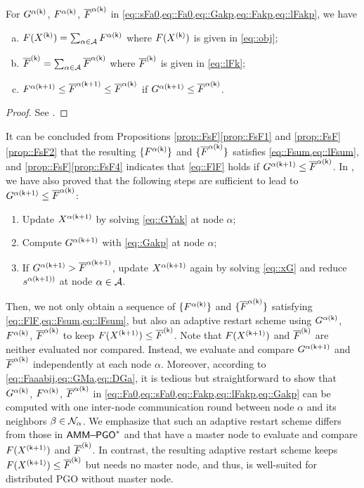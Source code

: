 {
\begin{prop}\label{prop::FsF}
For $G^{\ak}$, $F^{\ak}$, $\sF^{\ak}$ in \cref{eq::sFa0,eq::Fa0,eq::Gakp,eq::Fakp,eq::lFakp}, we have
\begin{enumerate}[(a)]
\item\label{prop::FsF1} $F(\Xk)=\sum_{\alpha\in\AA} F^{\ak}$ where $F(\Xk)$ is given in \cref{eq::obj};\\[-0.8em]
\item\label{prop::FsF2} $\sF^{(\sk)}=\sum_{\alpha\in\AA}\sF^{\ak}$  where $\sF^{(\sk)}$ is given in \cref{eq::lFk};\\[-0.8em]
\item\label{prop::FsF4} $F^{\akp}\leq\sF^{\akp} \leq \sF^{\ak}$ if $\sG^{\akp} \leq \sF^{\ak}$.
\end{enumerate}
\end{prop}
\begin{proof}
	See .
\end{proof}


It can be concluded from Propositions \ref{prop::FsF}\ref{prop::FsF1} and \ref{prop::FsF}\ref{prop::FsF2} that the resulting $\{F^{\ak}\}$ and $\{\lF^{\ak}\}$ satisfies \cref{eq::Fsum,eq::lFsum}, and \cref{prop::FsF}\ref{prop::FsF4} indicates that \cref{eq::FlF} holds if $\sG^{\akp} \leq \sF^{\ak}$. In , we have also proved that the following steps  are sufficient to lead to $\sG^{\akp} \leq \sF^{\ak}$:
\begin{enumerate}[leftmargin=0.45cm]
	\item  Update $\Xakp$ by solving \cref{eq::GYak} at node $\alpha$;
	\item Compute $G^{\akp}$ with \cref{eq::Gakp} at node $\alpha$;
	\item If $G^{\akp}>\sF^{\akp}$, update $\Xakp$ again by solving  \cref{eq::xG}  and reduce $s^{\akp)}$  at node $\alpha\in\AA$. 
\end{enumerate}
Then, we not only obtain a sequence of $\{F^{\ak}\}$ and $\{\lF^{\ak}\}$  satisfying \cref{eq::FlF,eq::Fsum,eq::lFsum}, but also an adaptive restart scheme using $G^{\ak}$, $F^{\ak}$, $\sF^{\ak}$ to keep $F(\Xkp)\leq \sF^{(\sk)}$. Note that $F(\Xkp)$ and $\lF^{(\sk)}$ are neither evaluated nor compared. Instead, we evaluate and compare $G^{\akp}$ and $\lF^{\ak}$ independently at each node $\alpha$. Moreover, according to  \cref{eq::Faaabij,eq::GMa,eq::DGa},  it is tedious but straightforward to show that $G^{\ak}$, $F^{\ak}$, $\sF^{\ak}$ in \cref{eq::Fa0,eq::sFa0,eq::Fakp,eq::lFakp,eq::Gakp} can be computed with one inter-node communication round between node $\alpha$ and its neighbors $\beta\in\NN_{\alpha}$. We emphasize that such an adaptive restart scheme differs from those in $\ammc$ and \cite{fan2019proximal,li2015accelerated,zhang2004nonmonotone} that have a master node to  evaluate and compare $F(\Xkp)$ and $\sF^{(\sk)}$. In contrast, the resulting adaptive restart scheme keeps $F(\Xkp)\leq \lF^{(\sk)}$ but needs no master node,  and thus, is well-suited for distributed PGO without master node.
}


